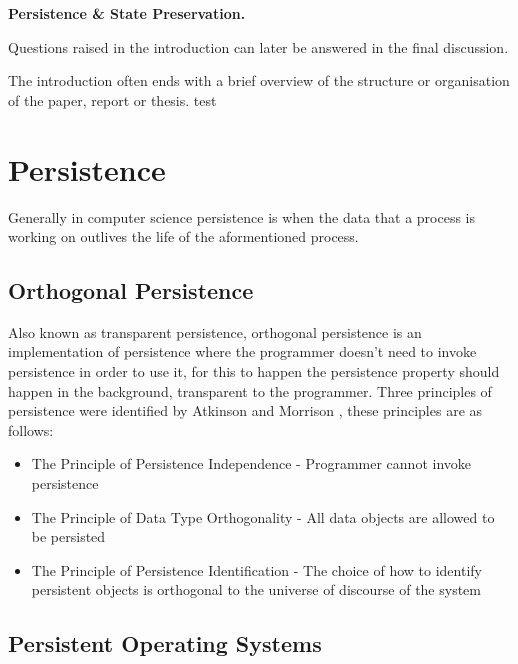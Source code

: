 \documentclass[a4,12pt]{article}
\newenvironment{boxit}{\begin{lrbox}{\savepar}
        \begin{minipage}[b]{4.6in}}
        {\end{minipage}\end{lrbox}\fbox{\usebox{\savepar}}}
\begin{document}
\begin{center}
\begin{boxit}
\textbf{Persistence \& State Preservation.}
\end{boxit}
\end{center}

Questions raised in the introduction can later be answered in the final discussion.

The introduction often ends with a brief overview of the structure or organisation of
the paper, report or thesis.
test~\citep{ADearle}
%
\section{Persistence}\label{sec:persistence}
Generally in computer science persistence is when the data that a process is working on outlives the life of the aformentioned process.
\subsection{Orthogonal Persistence}
Also known as transparent persistence, orthogonal persistence is an implementation of persistence where the programmer doesn't need to invoke persistence in order to use it, for this to happen the persistence property should happen in the background, transparent to the programmer.
Three principles of persistence were identified by Atkinson and Morrison \citep{Atkinson}, these principles are as follows:
\begin{itemize}
    \item{The Principle of Persistence Independence - Programmer cannot invoke persistence}
    \item{The Principle of Data Type Orthogonality - All data objects are allowed to be persisted}
    \item{The Principle of Persistence Identiﬁcation - The choice of how to identify persistent objects is orthogonal to the universe of discourse of the system}
\end{itemize}

\subsection{Persistent Operating Systems}\label{sec:persistentOS}
\end{document}
